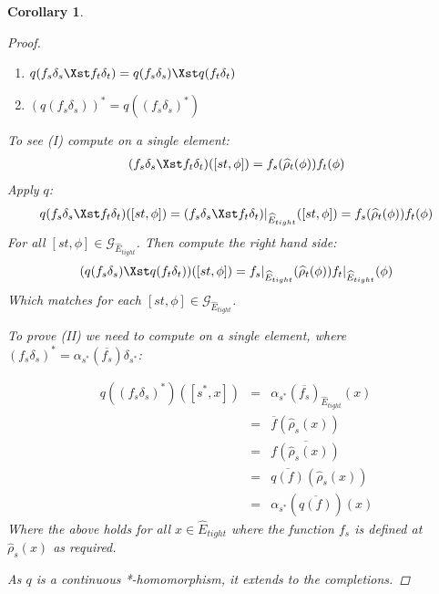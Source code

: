 \documentclass[11pt]{amsart}
\theoremstyle{plain}
\newtheorem{corollary}[theorem]{Corollary}%
\theoremstyle{definition}%
\theoremstyle{remark}%
\newcommand{\G}{\mathcal{G}}
\newcommand{\E}{\widehat{E}}
\begin{document}
\begin{corollary}
\begin{proof}
\begin{enumerate}[I]
\item $q(f_{s}\delta_{s} \Xst f_{t}\delta_{t}) = q(f_{s}\delta_{s})\Xst q(f_{t}\delta_{t})$
\item $(q(f_{s}\delta_{s}))^{*}=q((f_{s}\delta_{s})^{*})$
\end{enumerate}


To see (I) compute on a single element:
\begin{eqnarray*}
(f_{s}\delta_{s} \Xst f_{t}\delta_{t})([st,\phi])=f_{s}(\widehat{\rho}_{t}(\phi))f_{t}(\phi)
\end{eqnarray*}
Apply $q$:
\begin{eqnarray*}
q(f_{s}\delta_{s} \Xst f_{t}\delta_{t})([st,\phi])= (f_{s}\delta_{s} \Xst f_{t}\delta_{t})|_{\E_{tight}}([st,\phi]) =f_{s}(\widehat{\rho}_{t}(\phi))f_{t}(\phi)
\end{eqnarray*}
For all $[st,\phi] \in \G_{\E_{tight}}$. Then compute the right hand side: 
\begin{eqnarray*}
(q(f_{s}\delta_{s}) \Xst q(f_{t}\delta_{t}))([st,\phi])=f_{s}|_{\E_{tight}}(\widehat{\rho}_{t}(\phi))f_{t}|_{\E_{tight}}(\phi)
\end{eqnarray*}
Which matches for each $[st,\phi] \in \G_{\E_{tight}}$. 

To prove (II) we need to compute on a single element, where $(f_{s}\delta_{s})^{*}=\alpha_{s^{*}}(\overline{f_{s}})\delta_{s^{*}}$:

\begin{eqnarray*}
q((f_{s}\delta_{s})^{*})([s^{*},x])& = &\alpha_{s^{*}}(\overline{f_{s}})_{\E_{tight}}(x)\\
& = & \overline{f}(\widehat{\rho}_{s}(x)) \\ & = & \overline{f(\widehat{\rho}_{s}(x))} \\ & = & \overline{q(f)}(\widehat{\rho}_{s}(x)) \\ & = &  \alpha_{s^{*}}(\overline{q(f)})(x)
\end{eqnarray*}
Where the above holds for all $x \in \E_{tight}$ where the function $f_{s}$ is defined at $\widehat{\rho}_{s}(x)$ as required.

As $q$ is a continuous *-homomorphism, it extends to the completions.
\end{proof}


\end{corollary}
\end{document}
